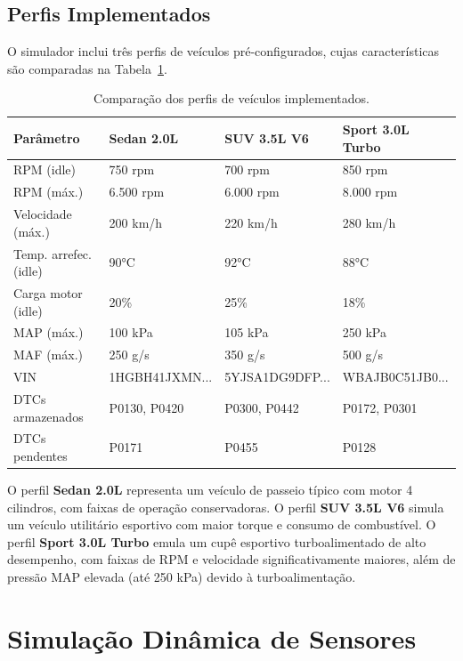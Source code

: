\subsection{Perfis Implementados}

O simulador inclui três perfis de veículos pré-configurados, cujas características são comparadas na Tabela~\ref{tab:perfis-comparacao}.

\begin{table}[H]
\centering
\caption{Comparação dos perfis de veículos implementados.}
\label{tab:perfis-comparacao}
\begin{tabular}{@{}llll@{}}
\toprule
\textbf{Parâmetro} & \textbf{Sedan 2.0L} & \textbf{SUV 3.5L V6} & \textbf{Sport 3.0L Turbo} \\
\midrule
RPM (idle) & 750 rpm & 700 rpm & 850 rpm \\
RPM (máx.) & 6.500 rpm & 6.000 rpm & 8.000 rpm \\
Velocidade (máx.) & 200 km/h & 220 km/h & 280 km/h \\
Temp. arrefec. (idle) & 90°C & 92°C & 88°C \\
Carga motor (idle) & 20\% & 25\% & 18\% \\
MAP (máx.) & 100 kPa & 105 kPa & 250 kPa \\
MAF (máx.) & 250 g/s & 350 g/s & 500 g/s \\
VIN & 1HGBH41JXMN... & 5YJSA1DG9DFP... & WBAJB0C51JB0... \\
DTCs armazenados & P0130, P0420 & P0300, P0442 & P0172, P0301 \\
DTCs pendentes & P0171 & P0455 & P0128 \\
\bottomrule
\end{tabular}
\end{table}

O perfil \textbf{Sedan 2.0L} representa um veículo de passeio típico com motor 4 cilindros, com faixas de operação conservadoras. O perfil \textbf{SUV 3.5L V6} simula um veículo utilitário esportivo com maior torque e consumo de combustível. O perfil \textbf{Sport 3.0L Turbo} emula um cupê esportivo turboalimentado de alto desempenho, com faixas de RPM e velocidade significativamente maiores, além de pressão MAP elevada (até 250 kPa) devido à turboalimentação.

\section{Simulação Dinâmica de Sensores}
\label{sec:sensores}

